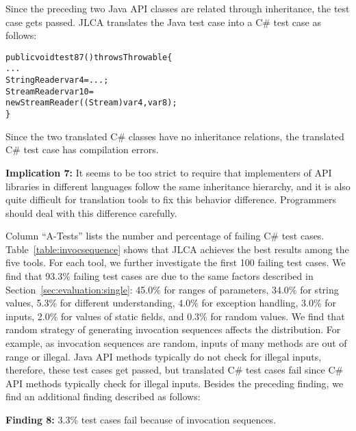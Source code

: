 Since the preceding two Java API classes are related through inheritance, the test case gets passed. JLCA translates the Java test case into a C\# test case as follows:

\begin{CodeOut}\vspace*{-1ex}
\begin{alltt}
public void test87() throws Throwable\{
  ...
  StringReader var4=...;
  StreamReader var10=
    new StreamReader((Stream)var4, var8);
\}
\end{alltt}
\end{CodeOut}\vspace*{-1ex}

Since the two translated C\# classes have no inheritance relations, the translated C\# test case has compilation errors.

\textbf{Implication 7:} It seems to be too strict to require that implementers of API libraries in different languages follow the same inheritance hierarchy, and it is also quite difficult for translation tools to fix this behavior difference. Programmers should deal with this difference carefully.



Column ``A-Tests'' lists the number and percentage of failing C\# test cases. Table~\ref{table:invocsequence} shows that JLCA achieves the best results among the five tools. For each tool, we further investigate the first 100 failing test cases. We find that 93.3\% failing test cases are due to the same factors described in Section~\ref{sec:evaluation:single}: 45.0\% for ranges of parameters, 34.0\% for string values, 5.3\% for different understanding, 4.0\% for exception handling, 3.0\% for  inputs, 2.0\% for values of static fields, and 0.3\% for random values. We find that random strategy of generating invocation sequences affects the distribution. For example, as invocation sequences are random, inputs of many methods are out of range or illegal. Java API methods typically do not check for illegal inputs, therefore, these test cases get passed, but translated C\# test cases fail since C\# API methods typically check for illegal inputs. Besides the preceding finding, we find an additional finding described as follows:

\textbf{Finding 8:} 3.3\% test cases fail because of invocation sequences.


